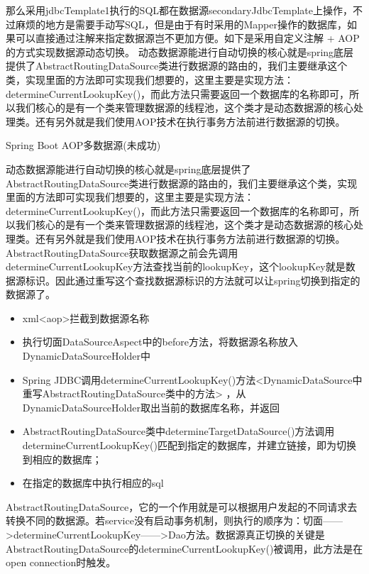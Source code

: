 \documentclass[12pt]{book}
\makeatletter
\numberwithin{dummy}{section}
\theoremstyle{ocrenumbox}
\theoremstyle{blacknumex}
\theoremstyle{blacknumbox}
\theoremstyle{ocrenum}
\renewcommand\paragraph{\@startsection{paragraph}{4}{\z@}
	{-2ex \@plus-.2ex \@minus .2ex}
	{.1ex}
	{\normalfont\small\sffamily\bfseries}}
\makeatother
\begin{document}
那么采用jdbcTemplate1执行的SQL都在数据源secondaryJdbcTemplate上操作，不过麻烦的地方是需要手动写SQL，但是由于有时采用的Mapper操作的数据库，如果可以直接通过注解来指定数据源岂不更加方便。如下是采用自定义注解 + AOP的方式实现数据源动态切换。
动态数据源能进行自动切换的核心就是spring底层提供了AbstractRoutingDataSource类进行数据源的路由的，我们主要继承这个类，实现里面的方法即可实现我们想要的，这里主要是实现方法：determineCurrentLookupKey()，而此方法只需要返回一个数据库的名称即可，所以我们核心的是有一个类来管理数据源的线程池，这个类才是动态数据源的核心处理类。还有另外就是我们使用AOP技术在执行事务方法前进行数据源的切换。

\paragraph{Spring Boot AOP多数据源(未成功)}

动态数据源能进行自动切换的核心就是spring底层提供了AbstractRoutingDataSource类进行数据源的路由的，我们主要继承这个类，实现里面的方法即可实现我们想要的，这里主要是实现方法：determineCurrentLookupKey()，而此方法只需要返回一个数据库的名称即可，所以我们核心的是有一个类来管理数据源的线程池，这个类才是动态数据源的核心处理类。还有另外就是我们使用AOP技术在执行事务方法前进行数据源的切换。AbstractRoutingDataSource获取数据源之前会先调用determineCurrentLookupKey方法查找当前的lookupKey，这个lookupKey就是数据源标识。因此通过重写这个查找数据源标识的方法就可以让spring切换到指定的数据源了。

\begin{itemize}
	\item {xml<aop>拦截到数据源名称}
	\item {执行切面DataSourceAspect中的before方法，将数据源名称放入 DynamicDataSourceHolder中}
	\item {Spring JDBC调用determineCurrentLookupKey()方法<DynamicDataSource中重写AbstractRoutingDataSource类中的方法> ，从DynamicDataSourceHolder取出当前的数据库名称，并返回}	
	\item {AbstractRoutingDataSource类中determineTargetDataSource()方法调用determineCurrentLookupKey()匹配到指定的数据库，并建立链接，即为切换到相应的数据库；}
	\item {在指定的数据库中执行相应的sql}
\end{itemize}

AbstractRoutingDataSource，它的一个作用就是可以根据用户发起的不同请求去转换不同的数据源。若service没有启动事务机制，则执行的顺序为：切面——>determineCurrentLookupKey——>Dao方法。数据源真正切换的关键是AbstractRoutingDataSource的determineCurrentLookupKey()被调用，此方法是在open connection时触发。
\end{document}
